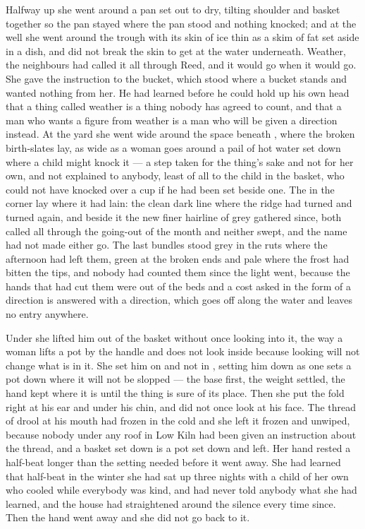Halfway up she went around a pan set out to dry, tilting shoulder and basket together so the pan stayed where the pan stood and nothing knocked; and at the well she went around the trough with its skin of ice thin as a skim of fat set aside in a dish, and did not break the skin to get at the water underneath. Weather, the neighbours had called it all through Reed, and it would go when it would go. She gave the instruction to the bucket, which stood where a bucket stands and wanted nothing from her. He had learned before he could hold up his own head that a thing called weather is a thing nobody has agreed to count, and that a man who wants a figure from weather is a man who will be given a direction instead. At the yard she went wide around the space beneath , where the broken birth-slates lay, as wide as a woman goes around a pail of hot water set down where a child might knock it --- a step taken for the thing's sake and not for her own, and not explained to anybody, least of all to the child in the basket, who could not have knocked over a cup if he had been set beside one. The  in the corner lay where it had lain: the clean dark line where the ridge had turned and turned again, and beside it the new finer hairline of grey gathered since, both called  all through the going-out of the month and neither swept, and the name had not made either go. The last bundles stood grey in the ruts where the afternoon had left them, green at the broken ends and pale where the frost had bitten the tips, and nobody had counted them since the light went, because the hands that had cut them were out of the beds and a cost asked in the form of a direction is answered with a direction, which goes off along the water and leaves no entry anywhere.

Under  she lifted him out of the basket without once looking into it, the way a woman lifts a pot by the handle and does not look inside because looking will not change what is in it. She set him on  and not in , setting him down as one sets a pot down where it will not be slopped --- the base first, the weight settled, the hand kept where it is until the thing is sure of its place. Then she put the fold right at his ear and under his chin, and did not once look at his face. The thread of drool at his mouth had frozen in the cold and she left it frozen and unwiped, because nobody under any roof in Low Kiln had been given an instruction about the thread, and a basket set down is a pot set down and left. Her hand rested a half-beat longer than the setting needed before it went away. She had learned that half-beat in the winter she had sat up three nights with a child of her own who cooled while everybody was kind, and had never told anybody what she had learned, and the house had straightened around the silence every time since. Then the hand went away and she did not go back to it.

